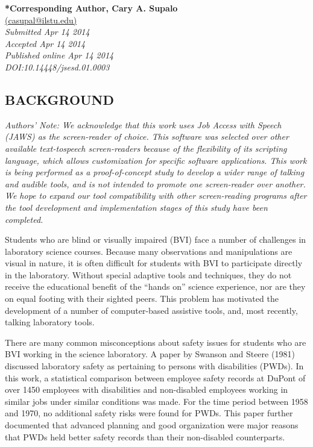 \documentclass[11.5pt]{sig-alternate} %
\begin{document}
\textbf{*Corresponding Author, Cary A. Supalo}\\
\href{mailto: casupal@ilstu.edu }{(casupal@ilstu.edu)} \\
\textit{Submitted Apr 14 2014 }\\
\textit{Accepted Apr 14 2014} \\
\textit{Published online Apr 14 2014} \\
\textit{DOI:10.14448/jsesd.01.0003} \\
\pagebreak
\clearpage
\begin{large}

\section*{BACKGROUND}
\textit{Authors’ Note: We acknowledge that this work uses Job Access with Speech (JAWS) as the screen-reader of choice. This software was selected over other available text-tospeech screen-readers because of the flexibility of its scripting language, which allows customization for specific software applications. This work is being performed as a proof-of-concept study to develop a wider range of talking and audible tools, and is not intended to promote one screen-reader over another. We hope to expand our tool compatibility with other screen-reading programs after the tool development and implementation stages of this study have been completed.}
 
Students who are blind or visually impaired (BVI) face a number of challenges in laboratory science courses.  Because many observations and manipulations are visual in nature, it is often difficult for students with BVI to participate directly in the laboratory.  Without special adaptive tools and techniques, they do not receive the educational benefit of the “hands on” science experience, nor are they on equal footing with their sighted peers. This problem has motivated the development of a number of computer-based assistive tools, and, most recently, talking laboratory tools. 

There are many common misconceptions about safety issues for students who are BVI working in the science laboratory.  A paper by Swanson and Steere (1981) discussed laboratory safety as pertaining to persons with disabilities (PWDs). In this work, a statistical comparison between employee safety records at DuPont of over 1450 employees with disabilities and non-disabled employees working in similar jobs under similar conditions was made.  For the time period between 1958 and 1970, no additional safety risks were found for PWDs. This paper further documented that advanced planning and good organization were major reasons that PWDs held better safety records than their non-disabled counterparts. 
 

\end{large}
\end{document}
